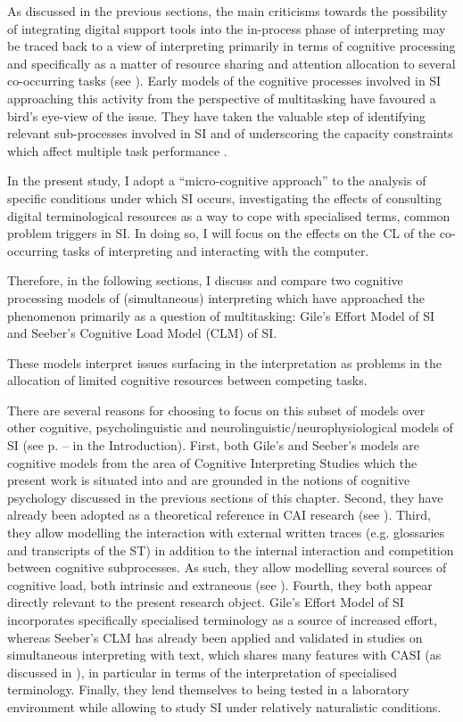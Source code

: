 As discussed in the previous sections, the main criticisms towards the possibility of integrating digital support tools into the in-process phase of interpreting may be traced back to a view of interpreting primarily in terms of cognitive processing and specifically as a matter of resource sharing and attention allocation to several co-occurring tasks (see ). Early models of the cognitive processes involved in SI approaching this activity from the perspective of multitasking have favoured a bird's eye-view of the issue. They have taken the valuable step of identifying relevant sub-processes involved in SI \citep{lederer_traduction_1981} and of underscoring the capacity constraints which affect multiple task performance \citep{kirchhoff_simultaneous_1976}.

In the present study, I adopt a ``micro-cognitive approach'' \citep[57]{martin_translation_2020} to the analysis of specific conditions under which SI occurs, investigating the effects of consulting digital terminological resources as a way to cope with specialised terms, common problem triggers in SI. In doing so, I will focus on the effects on the CL of the co-occurring tasks of interpreting and interacting with the computer.

Therefore, in the following sections, I discuss and compare two cognitive processing models of (simultaneous) interpreting which have approached the phenomenon primarily as a question of multitasking: Gile's Effort Model of SI and Seeber's Cognitive Load Model (CLM) of SI. 

These models interpret issues surfacing in the interpretation as problems in the allocation of limited cognitive resources between competing tasks.

There are several reasons for choosing to focus on this subset of models over other cognitive, psycholinguistic and neurolinguistic/neurophysiological models of SI (see p. \pageref{paradigm}--\pageref{paradigmEnd} in the Introduction). First, both Gile's and Seeber's models are cognitive models from the area of Cognitive Interpreting Studies which the present work is situated into and are grounded in the notions of cognitive psychology discussed in the previous sections of this chapter. Second, they have already been adopted as a theoretical reference in CAI research (see ). Third, they allow modelling the interaction with external written traces (e.g. glossaries and transcripts of the ST) in addition to the internal interaction and competition between cognitive subprocesses. As such, they allow modelling several sources of cognitive load, both intrinsic and extraneous (see ). Fourth, they both appear directly relevant to the present research object. Gile's Effort Model of SI incorporates specifically specialised terminology as a source of increased effort, whereas Seeber's CLM has already been applied and validated in studies on simultaneous interpreting with text, which shares many features with CASI (as discussed in ), in particular in terms of the interpretation of specialised terminology. Finally, they lend themselves to being tested in a laboratory environment while allowing to study SI under relatively naturalistic conditions.

